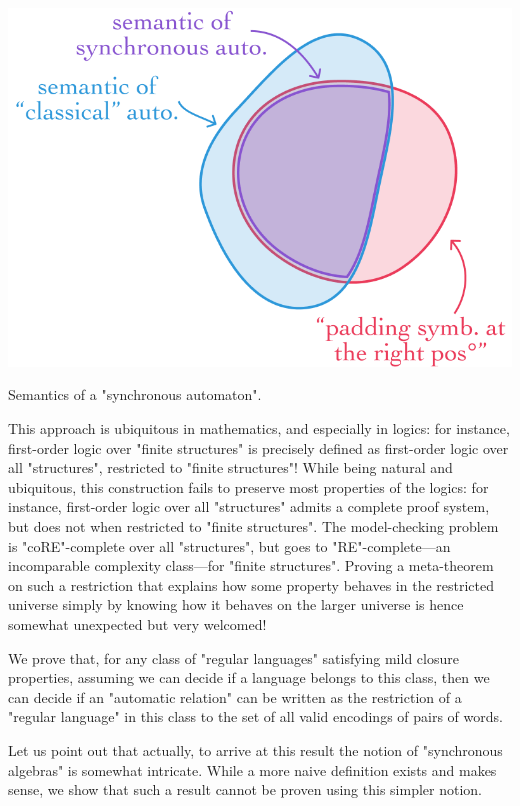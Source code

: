 \begin{marginfigure}
	\centering
	\includegraphics[width=\linewidth]{fig/intro/projection.png}
	\caption{\AP\label{fig:intro-projection}
		Semantics of a "synchronous automaton".
	}
\end{marginfigure}
This approach is ubiquitous in mathematics, and especially in logics:
for instance, first-order logic over "finite structures" is precisely
defined as first-order logic over all "structures", restricted to "finite structures"!
While being natural and ubiquitous, this construction fails to preserve most properties of the logics:
for instance, first-order logic over all "structures" admits a complete proof system,
but does not when restricted to "finite structures". The model-checking problem
is "coRE"-complete over all "structures", but goes to
"RE"-complete---an incomparable complexity class---for "finite structures".
Proving a meta-theorem on such a restriction that explains how some property
behaves in the restricted universe simply by knowing how it behaves on
the larger universe is hence somewhat unexpected but very welcomed!

\begin{contribution}
	We prove that, for any class of "regular languages" satisfying mild closure
	properties, assuming we can decide if a language belongs to this class,
	then we can decide if an "automatic relation" can be written as the restriction
	of a "regular language" in this class to the set of all valid encodings
	of pairs of words.
\end{contribution}

Let us point out that actually, to arrive at this result the notion
of "synchronous algebras" is somewhat intricate. While a more naive definition
exists and makes sense, we show that such a result cannot be proven using this
simpler notion.

